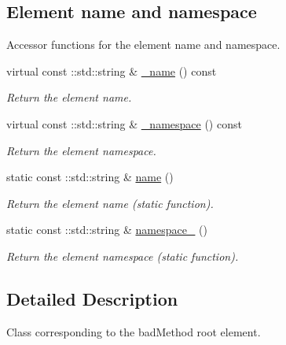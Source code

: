 \subsection*{Element name and namespace}
\label{_amgrpd4b5b61f6e07390f4af2465e04571f34}
Accessor functions for the element name and namespace. \begin{DoxyCompactItemize}
\item 
virtual const ::std::string \& \hyperlink{classopenstack_1_1xml_1_1BadMethod_aaac60df48bfe258138394f5d9d2a1150}{\_\-name} () const 
\begin{DoxyCompactList}\small\item\em Return the element name. \item\end{DoxyCompactList}\item 
virtual const ::std::string \& \hyperlink{classopenstack_1_1xml_1_1BadMethod_a2654da82152e898be9eeb51e0a0cb968}{\_\-namespace} () const 
\begin{DoxyCompactList}\small\item\em Return the element namespace. \item\end{DoxyCompactList}\item 
static const ::std::string \& \hyperlink{classopenstack_1_1xml_1_1BadMethod_a1452764a7acd25ca700da8ff83e6bed5}{name} ()
\begin{DoxyCompactList}\small\item\em Return the element name (static function). \item\end{DoxyCompactList}\item 
static const ::std::string \& \hyperlink{classopenstack_1_1xml_1_1BadMethod_ad3e0df7499d0f90d293e771f2937011a}{namespace\_\-} ()
\begin{DoxyCompactList}\small\item\em Return the element namespace (static function). \item\end{DoxyCompactList}\end{DoxyCompactItemize}


\subsection{Detailed Description}
Class corresponding to the badMethod root element. 

